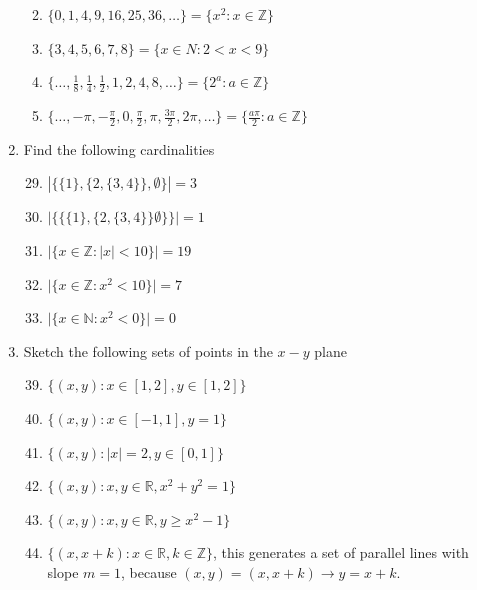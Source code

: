 \documentclass[10pt]{article}
\newcommand{\R}{\mathbb{R}}
\newcommand{\N}{\mathbb{N}}
\newcommand{\Z}{\mathbb{Z}}
\theoremstyle{definition}
\begin{document}
\begin{enumerate}[label=\Alph*.]
\begin{enumerate}[label=\arabic*.]
            \item $\{0,1,4,9,16,25,36,\dots\}=\{x^2 : x \in \Z \}$
            \item $\{3,4,5,6,7,8\} = \{x \in N: 2 < x < 9\}$
            \item $\{\dots,\frac{1}{8},\frac{1}{4},\frac{1}{2},1,2,4,8,\dots\} = \{2^a: a \in \Z\}$
            \item $\{\dots, -\pi,-\frac{\pi}{2},0,\frac{\pi}{2},\pi,\frac{3\pi}{2},2\pi,\dots\} = \{\frac{a\pi}{2}: a \in \Z \}$
        \end{enumerate}
    \item Find the following cardinalities
        \begin{enumerate}[label=\arabic*.]
                \setcounter{enumii}{28}
            \item $\left| \{\{1\}, \{2,\{3,4\}\},\emptyset\} \right| = 3$
            \item $\lvert \{\{\{1\},\{2,\{3,4\}\}\emptyset\}\} \rvert = 1 $
            \item $\lvert \{x \in \Z : |x| < 10\} \rvert = 19$
            \item $\lvert \{x \in \Z : x^2 < 10\} \rvert = 7$
            \item $\lvert \{x \in \N : x^2 < 0\} \rvert = 0$
        \end{enumerate}
    \item Sketch the following sets of points in the $x-y$ plane
        \begin{enumerate}[label=\arabic*.]
                \setcounter{enumii}{38}
            \item $\{(x,y) : x \in [1,2],y\in[1,2]\}$
            \item $\{(x,y):x\in[-1,1],y=1\}$
            \item $\{(x,y): |x|=2,y\in[0,1]\}$
            \item $\{(x,y):x,y\in\R,x^2+y^2=1\}$
            \item $\{(x,y):x,y\in\R,y\geq x^2-1\}$
            \item $\{(x,x+k):x\in\R,k\in\Z\}$, this generates a set of parallel lines with slope $m=1$, because $(x,y) = (x,x+k) \rightarrow y=x+k$.

\end{enumerate}
\end{enumerate}
\end{document}
